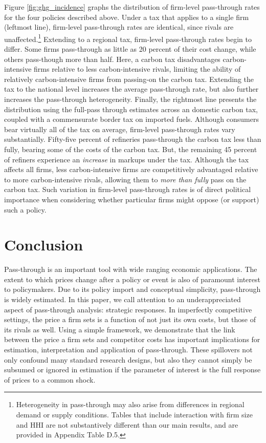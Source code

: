\documentclass[12pt]{article}
\begin{document}
Figure \ref{fig:ghg_incidence} graphs the distribution of firm-level pass-through rates for the four policies described above. Under a tax that applies to a single firm (leftmost line), firm-level pass-through rates are identical, since rivals are unaffected.\footnote{Heterogeneity in pass-through may also arise from differences in regional demand or supply conditions. Tables that include interaction with firm size and HHI are not substantively different than our main results, and are provided in Appendix Table D.5.} Extending to a regional tax, firm-level pass-through rates begin to differ.  Some firms pass-through as little as 20 percent of their cost change, while others pass-though more than half.  Here, a carbon tax disadvantages carbon-intensive firms relative to less carbon-intensive rivals, limiting the ability of relatively carbon-intensive firms from passing-on the carbon tax.  Extending the tax to the national level increases the average pass-through rate, but also further increases the pass-through heterogeneity. Finally, the rightmost line presents the distribution using the full-pass through estimates across an domestic carbon tax, coupled with a commensurate border tax on imported fuels. Although consumers bear virtually all of the tax on average, firm-level pass-through rates vary substantially. Fifty-five percent of refineries pass-through the carbon tax less than fully, bearing some of the costs of the carbon tax.   But, the remaining 45 percent of refiners experience an \textit{increase} in markups under the tax.  Although the tax affects all firms, less carbon-intensive firms are competitively advantaged relative to more carbon-intensive rivals, allowing them to \emph{more than fully} pass on the carbon tax.  Such variation in firm-level pass-through rates is of direct political importance when considering whether particular firms might oppose (or support) such a policy.

\section{Conclusion\label{sec:Conclusion}}

Pass-through is an important tool with wide ranging economic applications. The extent to which prices change after a policy or event is also of paramount interest to policymakers. Due to its policy import and conceptual simplicity, pass-through is widely estimated. In this paper, we call attention to an underappreciated aspect of pass-through analysis:  strategic responses. In imperfectly competitive settings, the price a firm sets is a function of not just its own costs, but those of its rivals as well. Using a simple framework, we demonstrate that the link between the price a firm sets and competitor costs has important implications for estimation, interpretation and application of pass-through. These spillovers not only confound many standard research designs, but also they cannot simply be subsumed or ignored in estimation if the parameter of interest is the full response of prices to a common shock.
\end{document}
